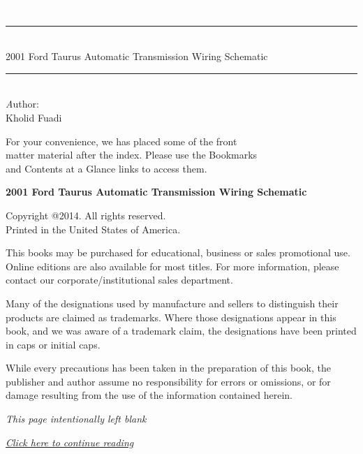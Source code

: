 \documentclass{book}
\newcommand{\HRule}{\rule{\linewidth}{2mm}}
\begin{document}
\begin{titlepage}

\begin{flushright}
\textcolor{white}{hidden text}

\vspace{7cm}

\HRule \\[0.4cm]
{\large 2001 Ford Taurus Automatic Transmission Wiring Schematic }\\[0.4cm]
\HRule \\[1.5cm]

\large{\emph Author:}\\
\small{ Kholid Fuadi }

\end{flushright}

\vfill

\begin{flushright}
\footnotesize{ For your convenience, we has placed some of the front \\
matter material after the index. Please use the Bookmarks \\
and Contents at a Glance links to access them. }
\end{flushright}

\end{titlepage}
\noindent
{\textbf {\footnotesize 2001 Ford Taurus Automatic Transmission Wiring Schematic }}

\vspace{6pt}

\noindent
\scriptsize{Copyright @2014. All rights reserved. \\Printed in the United
  States of America.}

\noindent
\scriptsize{This books may be purchased for educational, business or
  sales promotional use. Online editions are also available for most
  titles. For more information, please contact our
  corporate/institutional sales department.}

\vfill

\noindent
\scriptsize{Many of the designations used by manufacture and sellers
  to distinguish their products are claimed as trademarks. Where those
  designations appear in this book, and we was aware of a trademark
  claim, the designations have been printed in caps or initial caps.}

\noindent
\scriptsize{While every precautions has been taken in the preparation of
  this book, the publisher and author assume no responsibility for
  errors or omissions, or for damage resulting from the use of the
  information contained herein.}

\clearpage

\noindent
\begin{center}
{\normalsize \emph{This page intentionally left blank}}
\end{center}

\clearpage

\noindent
\emph{\large{\href{http://www.google.com}{Click here to continue reading}}}
\end{document}
